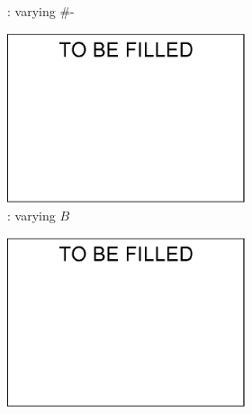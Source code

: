 {\begin{figure}[tb!]
\begin{subfigure}[b]{1.00\textwidth}
\begin{subfigure}[b]{0.245\textwidth}
          \begin{center}
            \vspace{-2ex}\caption{\tpch: varying \#-}
            \label{tpch-1-vary-join} 
          \end{center}
          \vspace{-1ex}
        \end{subfigure}
  		\begin{subfigure}[b]{0.245\textwidth}
          \centering
          \includegraphics[width=1\textwidth]{fig/a.eps}
          \begin{center}
            \vspace{-2ex}\caption{\tpch: varying $B$}
            \label{tpch-1-varyB} 
          \end{center}
          \vspace{-1ex}
        \end{subfigure}
  		\begin{subfigure}[b]{0.245\textwidth}
          \centering
          \includegraphics[width=1\textwidth]{fig/a.eps}

\end{subfigure}
\end{subfigure}
\end{figure}}
